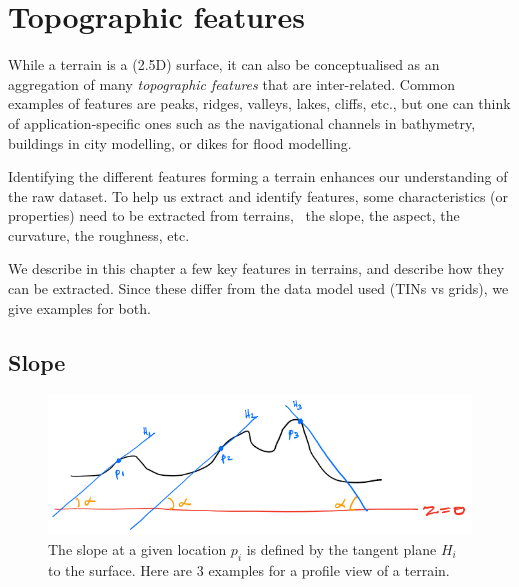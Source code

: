 
\setchapterpreamble[u]{\margintoc}
\graphicspath{{topofeatures/}}


\chapter{Topographic features}%
\label{chap:topofeatures}

While a terrain is a (2.5D) surface, it can also be conceptualised as an aggregation of many \emph{topographic features} that are inter-related.%
Common examples of features are peaks, ridges, valleys, lakes, cliffs, etc., but one can think of application-specific ones such as the navigational channels in bathymetry, buildings in city modelling, or dikes for flood modelling.

Identifying the different features forming a terrain enhances our understanding of the raw dataset.
To help us extract and identify features, some characteristics (or properties) need to be extracted from terrains, \eg\ the slope, the aspect, the curvature, the roughness, etc.

We describe in this chapter a few key features in terrains, and describe how they can be extracted.
Since these differ from the data model used (TINs vs grids), we give examples for both.


%
\section{Slope}%

\begin{figure}
  \centering
  \includegraphics[width=\linewidth]{figs/slope_concept}
  \caption{The slope at a given location $p_i$ is defined by the tangent plane $H_i$ to the surface. Here are 3 examples for a profile view of a terrain.}%
\label{fig:slope_concept}
\end{figure}

